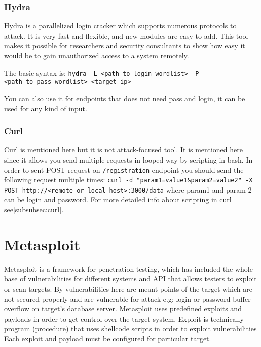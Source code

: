 \documentclass{article}[12pt]
\begin{document}
\subsubsection{Hydra}
\label{subsubsec:hydra}
Hydra is a parallelized login cracker which supports numerous protocols to attack.
It is very fast and flexible, and new modules are easy to add.
This tool makes it possible for researchers and security consultants to show how easy it would be to gain unauthorized access to a system remotely.

The basic syntax is: \texttt{hydra -L <path\_to\_login\_wordlist> -P <path\_to\_pass\_wordlist> <target\_ip> }

You can also use it for endpoints that does not need pass and login, it can be used for any kind of input.

\subsubsection{Curl}
Curl is mentioned here but it is not attack-focused tool.
It is mentioned here since it allows you send multiple requests in looped way by scripting in bash.
In order to sent POST request on \texttt{/registration} endpoint you should send the following request multiple times:\newline \newline
\texttt{curl -d "param1=value1\&param2=value2" -X POST http://<remote\_or\_local\_host>:3000/data} \newline
where param1 and param 2 can be login and password.
For more detailed info about scripting in curl see\ref{subsubsec:curl}.


\section{Metasploit}
Metasploit is a framework for penetration testing, which has included the whole base of vulnerabilities for different systems and API that allows testers to exploit or scan targets.
By vulnerabilities here are meant points of the target which are not secured properly and are vulnerable for attack e.g:
login or password buffer overflow on target's database server.
Metasploit uses predefined exploits and payloads in order to get control over the target system.
Exploit is technically program (procedure) that uses shellcode scripts in order to exploit vulnerabilities Each exploit and payload must be configured for particular target.
\end{document}
